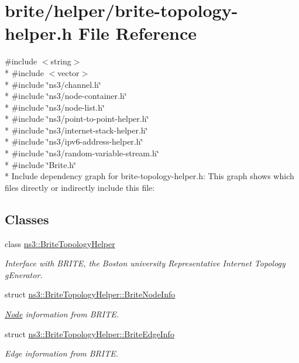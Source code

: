 \hypertarget{brite-topology-helper_8h}{}\section{brite/helper/brite-\/topology-\/helper.h File Reference}
\label{brite-topology-helper_8h}
{\ttfamily \#include $<$string$>$}\\*
{\ttfamily \#include $<$vector$>$}\\*
{\ttfamily \#include \char`\"{}ns3/channel.\+h\char`\"{}}\\*
{\ttfamily \#include \char`\"{}ns3/node-\/container.\+h\char`\"{}}\\*
{\ttfamily \#include \char`\"{}ns3/node-\/list.\+h\char`\"{}}\\*
{\ttfamily \#include \char`\"{}ns3/point-\/to-\/point-\/helper.\+h\char`\"{}}\\*
{\ttfamily \#include \char`\"{}ns3/internet-\/stack-\/helper.\+h\char`\"{}}\\*
{\ttfamily \#include \char`\"{}ns3/ipv6-\/address-\/helper.\+h\char`\"{}}\\*
{\ttfamily \#include \char`\"{}ns3/random-\/variable-\/stream.\+h\char`\"{}}\\*
{\ttfamily \#include \char`\"{}Brite.\+h\char`\"{}}\\*
Include dependency graph for brite-\/topology-\/helper.h\+:
This graph shows which files directly or indirectly include this file\+:
\subsection*{Classes}
\begin{DoxyCompactItemize}
\item 
class \hyperlink{classns3_1_1BriteTopologyHelper}{ns3\+::\+Brite\+Topology\+Helper}
\begin{DoxyCompactList}\small\item\em Interface with B\+R\+I\+TE, the Boston university Representative Internet Topology g\+Enerator. \end{DoxyCompactList}\item 
struct \hyperlink{structns3_1_1BriteTopologyHelper_1_1BriteNodeInfo}{ns3\+::\+Brite\+Topology\+Helper\+::\+Brite\+Node\+Info}
\begin{DoxyCompactList}\small\item\em \hyperlink{classns3_1_1Node}{Node} information from B\+R\+I\+TE. \end{DoxyCompactList}\item 
struct \hyperlink{structns3_1_1BriteTopologyHelper_1_1BriteEdgeInfo}{ns3\+::\+Brite\+Topology\+Helper\+::\+Brite\+Edge\+Info}
\begin{DoxyCompactList}\small\item\em Edge information from B\+R\+I\+TE. \end{DoxyCompactList}\end{DoxyCompactItemize}
